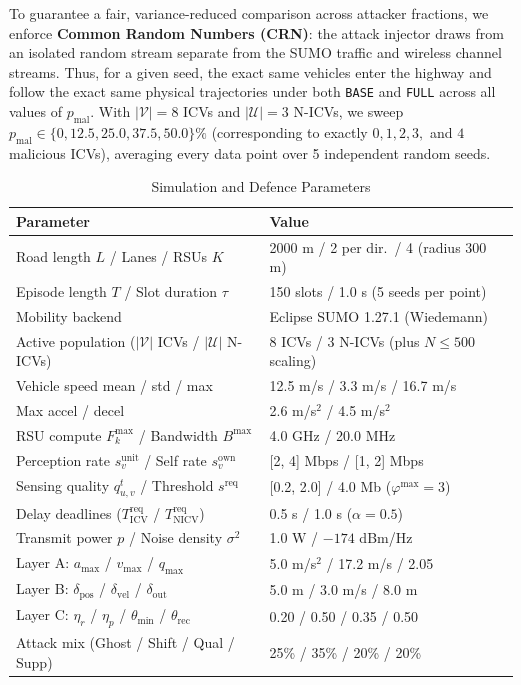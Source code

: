 \documentclass[conference]{IEEEtran}
\begin{document}
To guarantee a fair, variance-reduced comparison across attacker fractions, we enforce \textbf{Common Random Numbers (CRN)}: the attack injector draws from an isolated random stream separate from the SUMO traffic and wireless channel streams. Thus, for a given seed, the exact same vehicles enter the highway and follow the exact same physical trajectories under both \texttt{BASE} and \texttt{FULL} across all values of $p_{\mathrm{mal}}$. With $|\mathcal{V}|=8$ ICVs and $|\mathcal{U}|=3$ N-ICVs, we sweep $p_{\mathrm{mal}}\in\{0, 12.5, 25.0, 37.5, 50.0\}\%$ (corresponding to exactly $0, 1, 2, 3,$ and $4$ malicious ICVs), averaging every data point over 5 independent random seeds.

\begin{table}[t]
\caption{Simulation and Defence Parameters}
\begin{center}
\footnotesize
\begin{tabular}{ll}
\toprule
\textbf{Parameter} & \textbf{Value}\\
\midrule
Road length $L$ / Lanes / RSUs $K$ & 2000 m / 2 per dir.\ / 4 (radius 300 m)\\
Episode length $T$ / Slot duration $\tau$ & 150 slots / 1.0 s (5 seeds per point)\\
Mobility backend & Eclipse SUMO 1.27.1 (Wiedemann)\\
Active population ($|\mathcal{V}|$ ICVs / $|\mathcal{U}|$ N-ICVs) & 8 ICVs / 3 N-ICVs (plus $N\le 500$ scaling)\\
Vehicle speed mean / std / max & 12.5 m/s / 3.3 m/s / 16.7 m/s\\
Max accel / decel & 2.6 m/s$^2$ / 4.5 m/s$^2$\\
RSU compute $F^{\max}_k$ / Bandwidth $B^{\max}$ & 4.0 GHz / 20.0 MHz\\
Perception rate $s^{\mathrm{unit}}_v$ / Self rate $s^{\mathrm{own}}_v$ & [2, 4] Mbps / [1, 2] Mbps\\
Sensing quality $q^t_{u,v}$ / Threshold $s^{\mathrm{req}}$ & [0.2, 2.0] / 4.0 Mb ($\varphi^{\max}=3$)\\
Delay deadlines ($T^{\mathrm{req}}_{\mathrm{ICV}}$ / $T^{\mathrm{req}}_{\mathrm{NICV}}$) & 0.5 s / 1.0 s ($\alpha=0.5$)\\
Transmit power $p$ / Noise density $\sigma^2$ & 1.0 W / $-174$ dBm/Hz\\
\midrule
Layer A: $a_{\max}$ / $v_{\max}$ / $q_{\max}$ & 5.0 m/s$^2$ / 17.2 m/s / 2.05\\
Layer B: $\delta_{\mathrm{pos}}$ / $\delta_{\mathrm{vel}}$ / $\delta_{\mathrm{out}}$ & 5.0 m / 3.0 m/s / 8.0 m\\
Layer C: $\eta_r$ / $\eta_p$ / $\theta_{\min}$ / $\theta_{\mathrm{rec}}$ & 0.20 / 0.50 / 0.35 / 0.50\\
Attack mix (Ghost / Shift / Qual / Supp) & 25\% / 35\% / 20\% / 20\%\\
\bottomrule
\end{tabular}
\label{tab:params}
\end{center}
\end{table}
\end{document}
